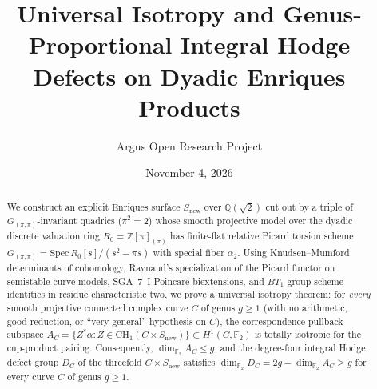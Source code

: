 \documentclass[10pt,reqno]{amsart}
\title[Universal Isotropy and Integral Hodge Defects on Enriques Products]
{Universal Isotropy and Genus-Proportional Integral Hodge Defects on Dyadic Enriques Products}
\author{Argus Open Research Project}
\date{November 4, 2026}
\theoremstyle{definition}
\begin{document}
\begin{abstract}
We construct an explicit Enriques surface $S_{\mathrm{new}}$ over $\mathbb{Q}(\sqrt{2})$ cut out by a triple of $G_{(\pi,\pi)}$-invariant quadrics ($\pi^2=2$) whose smooth projective model over the dyadic discrete valuation ring $R_0 = \mathbb{Z}[\pi]_{(\pi)}$ has finite-flat relative Picard torsion scheme $G_{(\pi,\pi)} = \mathrm{Spec}\,R_0[s]/(s^2-\pi s)$ with special fiber $\alpha_2$. Using Knudsen--Mumford determinants of cohomology, Raynaud's specialization of the Picard functor on semistable curve models, SGA~7~I Poincaré biextensions, and $BT_1$ group-scheme identities in residue characteristic two, we prove a universal isotropy theorem: for \emph{every} smooth projective connected complex curve $C$ of genus $g \ge 1$ (with no arithmetic, good-reduction, or ``very general'' hypothesis on $C$), the correspondence pullback subspace $A_C = \{Z^*\alpha : Z \in \mathrm{CH}_1(C \times S_{\mathrm{new}})\} \subset H^1(C,\mathbb{F}_2)$ is totally isotropic for the cup-product pairing. Consequently, $\dim_{\mathbb{F}_2} A_C \le g$, and the degree-four integral Hodge defect group $D_C$ of the threefold $C \times S_{\mathrm{new}}$ satisfies $\dim_{\mathbb{F}_2} D_C = 2g - \dim_{\mathbb{F}_2} A_C \ge g$ for every curve $C$ of genus $g \ge 1$.
\end{abstract}
\maketitle
\end{document}
